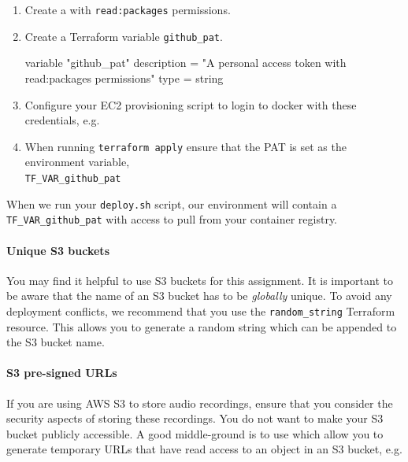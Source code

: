 \documentclass{csse4400}
\begin{document}
\begin{enumerate}
  \item Create a  with \texttt{read:packages} permissions.
  \item Create a Terraform variable \texttt{github\_pat}.
\begin{code}[language=terraform]{}
variable "github_pat" {
    description = "A personal access token with read:packages permissions"
    type        = string
}
\end{code}
  \item Configure your EC2 provisioning script to login to docker with these credentials, e.g.
  \item When running \texttt{terraform apply} ensure that the PAT is set as the environment variable,\\
  \texttt{TF\_VAR\_github\_pat}
\end{enumerate}

When we run your \texttt{deploy.sh} script,
our environment will contain a \texttt{TF\_VAR\_github\_pat} with access to pull from your container registry.


\paragraph{Unique S3 buckets}
You may find it helpful to use S3 buckets for this assignment.
It is important to be aware that the name of an S3 bucket has to be \textsl{globally} unique.
To avoid any deployment conflicts,
we recommend that you use the \texttt{random\_string} Terraform resource.
This allows you to generate a random string which can be appended to the S3 bucket name.


\paragraph{S3 pre-signed URLs}
If you are using AWS S3 to store audio recordings,
ensure that you consider the security aspects of storing these recordings.
You do not want to make your S3 bucket publicly accessible.
A good middle-ground is to use  which allow you to generate temporary URLs that have read access to an object in an S3 bucket, e.g.
\end{document}
